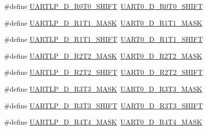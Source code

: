 \begin{DoxyCompactItemize}
\item 
\#define \hyperlink{group___backward___compatibility___symbols_gab2cd42b68d606b5ba4d1b496d41a9a1a}{U\+A\+R\+T\+L\+P\+\_\+\+D\+\_\+\+R0\+T0\+\_\+\+S\+H\+I\+FT}~\hyperlink{group___u_a_r_t0___register___masks_gad74330f7b3c879005943f6bfb6641578}{U\+A\+R\+T0\+\_\+\+D\+\_\+\+R0\+T0\+\_\+\+S\+H\+I\+FT}
\item 
\#define \hyperlink{group___backward___compatibility___symbols_ga5ee9734a722b015b5cf6a8f0f242445b}{U\+A\+R\+T\+L\+P\+\_\+\+D\+\_\+\+R1\+T1\+\_\+\+M\+A\+SK}~\hyperlink{group___u_a_r_t0___register___masks_ga814724f492eb31ac3d56cf7b4c639cdf}{U\+A\+R\+T0\+\_\+\+D\+\_\+\+R1\+T1\+\_\+\+M\+A\+SK}
\item 
\#define \hyperlink{group___backward___compatibility___symbols_ga9ae77e2a0f335113ae450295a927aafe}{U\+A\+R\+T\+L\+P\+\_\+\+D\+\_\+\+R1\+T1\+\_\+\+S\+H\+I\+FT}~\hyperlink{group___u_a_r_t0___register___masks_ga1032022de13132a13b5e09a30839b493}{U\+A\+R\+T0\+\_\+\+D\+\_\+\+R1\+T1\+\_\+\+S\+H\+I\+FT}
\item 
\#define \hyperlink{group___backward___compatibility___symbols_ga5e511688ca9d65b6f298ecf4c9983f92}{U\+A\+R\+T\+L\+P\+\_\+\+D\+\_\+\+R2\+T2\+\_\+\+M\+A\+SK}~\hyperlink{group___u_a_r_t0___register___masks_gaa584f3ebf164a497e3008771d511fc7b}{U\+A\+R\+T0\+\_\+\+D\+\_\+\+R2\+T2\+\_\+\+M\+A\+SK}
\item 
\#define \hyperlink{group___backward___compatibility___symbols_ga9c26b19d89d75331664cd34366569eaa}{U\+A\+R\+T\+L\+P\+\_\+\+D\+\_\+\+R2\+T2\+\_\+\+S\+H\+I\+FT}~\hyperlink{group___u_a_r_t0___register___masks_ga8fbb4283aa79977ed0f576dfd3960f64}{U\+A\+R\+T0\+\_\+\+D\+\_\+\+R2\+T2\+\_\+\+S\+H\+I\+FT}
\item 
\#define \hyperlink{group___backward___compatibility___symbols_ga147acf9d25c9aed961994759b4a09adf}{U\+A\+R\+T\+L\+P\+\_\+\+D\+\_\+\+R3\+T3\+\_\+\+M\+A\+SK}~\hyperlink{group___u_a_r_t0___register___masks_gadfa2cd1862bf6eb53ee9ac5da895aafe}{U\+A\+R\+T0\+\_\+\+D\+\_\+\+R3\+T3\+\_\+\+M\+A\+SK}
\item 
\#define \hyperlink{group___backward___compatibility___symbols_ga71795a0a7638b19ce28c042efd756c10}{U\+A\+R\+T\+L\+P\+\_\+\+D\+\_\+\+R3\+T3\+\_\+\+S\+H\+I\+FT}~\hyperlink{group___u_a_r_t0___register___masks_ga8b40852e3caf9131f78ca2a2238c5a5d}{U\+A\+R\+T0\+\_\+\+D\+\_\+\+R3\+T3\+\_\+\+S\+H\+I\+FT}
\item 
\#define \hyperlink{group___backward___compatibility___symbols_ga4c58c78e1a9349104a0d2e4fb70fd84c}{U\+A\+R\+T\+L\+P\+\_\+\+D\+\_\+\+R4\+T4\+\_\+\+M\+A\+SK}~\hyperlink{group___u_a_r_t0___register___masks_ga9ef0e5c43310e85c56accdcac2193bd7}{U\+A\+R\+T0\+\_\+\+D\+\_\+\+R4\+T4\+\_\+\+M\+A\+SK}

\end{DoxyCompactItemize}

